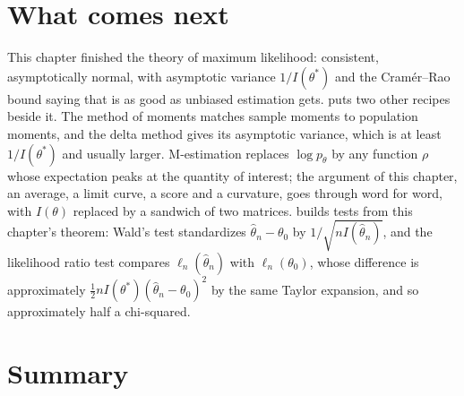 \section{What comes next}
\label{sec:mle-next}

This chapter finished the theory of maximum likelihood: consistent, asymptotically normal, with asymptotic variance $1/I(\theta^*)$ and the Cram\'er--Rao bound saying that is as good as unbiased estimation gets.
 puts two other recipes beside it.
The method of moments matches sample moments to population moments, and the delta method gives its asymptotic variance, which is at least $1/I(\theta^*)$ and usually larger.
M-estimation replaces $\log p_\theta$ by any function $\rho$ whose expectation peaks at the quantity of interest; the argument of this chapter, an average, a limit curve, a score and a curvature, goes through word for word, with $I(\theta)$ replaced by a sandwich of two matrices.
 builds tests from this chapter's theorem: Wald's test standardizes $\hat{\theta}_n - \theta_0$ by $1/\sqrt{nI(\hat{\theta}_n)}$, and the likelihood ratio test compares $\ell_n(\hat{\theta}_n)$ with $\ell_n(\theta_0)$, whose difference is approximately $\frac12 nI(\theta^*)(\hat{\theta}_n - \theta_0)^2$ by the same Taylor expansion, and so approximately half a chi-squared.

\section{Summary}
\label{sec:mle-summary}

